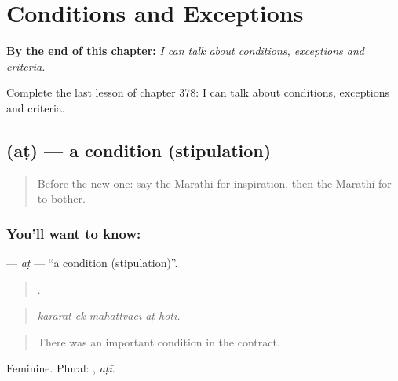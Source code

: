 
\chapter{Conditions and Exceptions}
\label{ch:mr-conditions-and-exceptions}

\begin{chapteropening}
\textbf{By the end of this chapter:} \emph{I can talk about conditions, exceptions and criteria.}

Complete the last lesson of chapter 378: I can talk about conditions, exceptions and criteria.
\end{chapteropening}

\section[\texorpdfstring{\mr{अट} (aṭ)}{अट (aṭ)}]{ (aṭ) — a condition (stipulation)}

\label{lesson:MR-C378-at}



\begin{quote}
Before the new one: say the Marathi for inspiration, then the Marathi for to bother.
\end{quote}

\subsection*{You'll want to know: }
\textbf{} — \emph{aṭ} — \textquotedblleft{}a condition (stipulation)\textquotedblright{}.

\begin{quote}
    .
\end{quote}

\begin{quote}
\emph{karārāt ek mahattvācī aṭ hotī.}
\end{quote}

\begin{quote}
There was an important condition in the contract.
\end{quote}

Feminine. Plural: , \emph{aṭī}.

